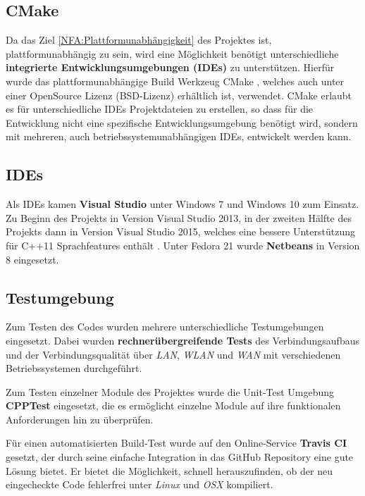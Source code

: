 \subsection{CMake}
Da das Ziel \ref{NFA:Plattformunabhängigkeit} des Projektes ist, plattformunabhängig zu sein, wird eine Möglichkeit benötigt unterschiedliche \textbf{integrierte Entwicklungsumgebungen (IDEs)} zu unterstützen.
Hierfür wurde das plattformunabhängige Build Werkzeug CMake \cite{Cmake}, welches auch unter einer OpenSource Lizenz (BSD-Lizenz) \cite{Cmake:License} erhältlich ist, verwendet. CMake erlaubt es für unterschiedliche IDEs Projektdateien zu erstellen, so dass für die Entwicklung nicht eine spezifische Entwicklungsumgebung benötigt wird, sondern mit mehreren, auch betriebssystemunabhängigen IDEs, entwickelt werden kann.

\subsection{IDEs}
Als IDEs kamen \textbf{Visual Studio} \cite{Visual Studio} unter Windows 7 und Windows 10 zum Einsatz. Zu Beginn des Projekts in Version Visual Studio 2013, in der zweiten Hälfte des Projekts dann in Version Visual Studio 2015, welches eine bessere Unterstützung für C++11 Sprachfeatures enthält \cite{Visual Studio:C++11}. Unter Fedora 21 wurde \textbf{Netbeans} \cite{NetBeans} in Version 8 eingesetzt.

\subsection{Testumgebung}
Zum Testen des Codes wurden mehrere unterschiedliche Testumgebungen eingesetzt. Dabei wurden \textbf{rechnerübergreifende Tests} des Verbindungsaufbaus und der Verbindungsqualität über \textit{LAN}, \textit{WLAN} und \textit{WAN} mit verschiedenen Betriebssystemen durchgeführt. 

Zum Testen einzelner Module des Projektes wurde die Unit-Test Umgebung \textbf{CPPTest} \cite{CppTest} eingesetzt, die es ermöglicht einzelne Module auf ihre funktionalen Anforderungen hin zu überprüfen. 

Für einen automatisierten Build-Test wurde auf den Online-Service \textbf{Travis CI} \cite{TravisCI} gesetzt, der durch seine einfache Integration in das GitHub Repository eine gute Lösung bietet. Er bietet die Möglichkeit, schnell herauszufinden, ob der neu eingecheckte Code fehlerfrei unter \textit{Linux} und \textit{OSX} kompiliert.

